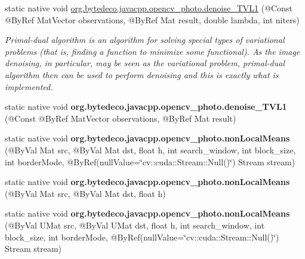 \begin{DoxyCompactItemize}
static native void \hyperlink{group__photo__denoise_ga69dacfb1b3386b1b2a2d270314c1b548}{org.\+bytedeco.\+javacpp.\+opencv\+\_\+photo.\+denoise\+\_\+\+T\+V\+L1} (@Const @By\+Ref Mat\+Vector observations, @By\+Ref Mat result, double lambda, int niters)
\begin{DoxyCompactList}\small\item\em Primal-\/dual algorithm is an algorithm for solving special types of variational problems (that is, finding a function to minimize some functional). As the image denoising, in particular, may be seen as the variational problem, primal-\/dual algorithm then can be used to perform denoising and this is exactly what is implemented. \end{DoxyCompactList}\item 
\mbox{\label{group__photo__denoise_ga0d1ce8149027c7aefece96cd1e4d3041}} 
static native void {\bfseries org.\+bytedeco.\+javacpp.\+opencv\+\_\+photo.\+denoise\+\_\+\+T\+V\+L1} (@Const @By\+Ref Mat\+Vector observations, @By\+Ref Mat result)
\item 
\mbox{\label{group__photo__denoise_ga1a81d220d5caa6a845d0350f835a0368}} 
static native void {\bfseries org.\+bytedeco.\+javacpp.\+opencv\+\_\+photo.\+non\+Local\+Means} (@By\+Val Mat src, @By\+Val Mat dst, float h, int search\+\_\+window, int block\+\_\+size, int border\+Mode, @By\+Ref(null\+Value=\char`\"{}cv\+::cuda\+::\+Stream\+::\+Null()\char`\"{}) Stream stream)
\item 
\mbox{\label{group__photo__denoise_gae5ebb6f69dba02cf738a3bbaef087035}} 
static native void {\bfseries org.\+bytedeco.\+javacpp.\+opencv\+\_\+photo.\+non\+Local\+Means} (@By\+Val Mat src, @By\+Val Mat dst, float h)
\item 
\mbox{\label{group__photo__denoise_ga4405694ec40ecd225b612d830efacb81}} 
static native void {\bfseries org.\+bytedeco.\+javacpp.\+opencv\+\_\+photo.\+non\+Local\+Means} (@By\+Val U\+Mat src, @By\+Val U\+Mat dst, float h, int search\+\_\+window, int block\+\_\+size, int border\+Mode, @By\+Ref(null\+Value=\char`\"{}cv\+::cuda\+::\+Stream\+::\+Null()\char`\"{}) Stream stream)
\item 
\mbox{\label{group__photo__denoise_ga4bf87107d373b7bd23bfdb7f51b2cde5}} 

\end{DoxyCompactItemize}

